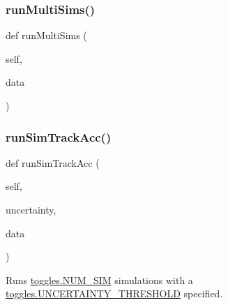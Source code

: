 \subsubsection{\texorpdfstring{run\+Multi\+Sims()}{runMultiSims()}}
{\footnotesize\ttfamily def run\+Multi\+Sims (\begin{DoxyParamCaption}\item[{}]{self,  }\item[{}]{data }\end{DoxyParamCaption})}

\mbox{\label{classdynamicfilterapp_1_1test__simulations_1_1_simulation_test_a87a8325e13e3f2641a3371a9c72c9583}} 
\subsubsection{\texorpdfstring{run\+Sim\+Track\+Acc()}{runSimTrackAcc()}}
{\footnotesize\ttfamily def run\+Sim\+Track\+Acc (\begin{DoxyParamCaption}\item[{}]{self,  }\item[{}]{uncertainty,  }\item[{}]{data }\end{DoxyParamCaption})}



Runs \mbox{\hyperlink{namespacedynamicfilterapp_1_1toggles_a3baf5565851cd87736238d8dddfc1106}{toggles.\+N\+U\+M\+\_\+\+S\+IM}} simulations with a \mbox{\hyperlink{namespacedynamicfilterapp_1_1toggles_aaefdc27b85545eb4a910f5c65f7d8bbb}{toggles.\+U\+N\+C\+E\+R\+T\+A\+I\+N\+T\+Y\+\_\+\+T\+H\+R\+E\+S\+H\+O\+LD}} specified. 


